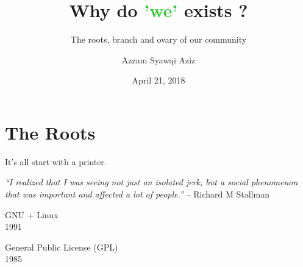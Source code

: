 \documentclass[notes,usenames,dvipsnames]{beamer}       %
\title{Why do \textcolor{LimeGreen}{'we'} exists ?}
\subtitle{The roots, branch and ovary of our community}
\author{Azzam Syawqi Aziz}
\date{April 21, 2018}
\begin{document}
\maketitle

\section{The Roots}

\begin{frame}%
  \begin{center}
    \Huge It's all start with a printer.
  \end{center}
\end{frame}

\begin{frame}%
  \begin{center}
    \emph{``I realized that I was seeing not just an isolated jerk,
      but a social phenomenon that was important and affected a lot of
      people.''}
    -- Richard M Stallman
  \end{center}
\end{frame}

\begin{frame}%
  \begin{center}
    \Huge GNU + Linux \\
    \small 1991
  \end{center}
\end{frame}

\begin{frame}%
  \begin{center}
    \huge General Public License (GPL) \\
    \small 1985
  \end{center}
\end{frame}
\end{document}
